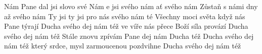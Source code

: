 \begin{TEXT}{Nám Pane dal jsi slovo své}
\REFREN  Nám e  jsi   \NL
{} svého  nám   \NL
ať     \NL
{} svého  nám 
\SLOKA Zůstaň  s námi  dny až \NL
{} svého  nám   \NL
Ty jsi  ty jsi  pro nás  \NL
{} svého  nám té  
\SLOKA Všechny moci světa když nás Pane týrají \NL
Ducha svého dej nám též \NL
ve víře nás přece Boží síla provází \NL
Ducha svého dej nám též 
\SLOKA Stále znovu zpívám Pane dej nám Ducha též \NL
Ducha svého dej nám též \NL
který srdce, mysl zarmoucenou pozdvihne \NL
Ducha svého dej nám též \NL
\end{TEXT}
